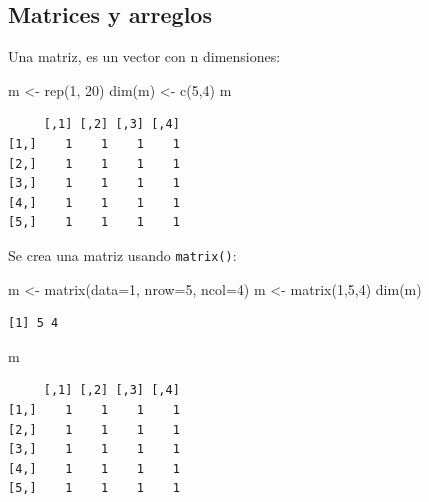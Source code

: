 \documentclass[
  letterpaper,
  DIV=11,
  numbers=noendperiod]{scrartcl}
\newenvironment{Shaded}{\begin{snugshade}}{\end{snugshade}}
\newcommand{\AttributeTok}[1]{\textcolor[rgb]{0.40,0.45,0.13}{#1}}
\newcommand{\DecValTok}[1]{\textcolor[rgb]{0.68,0.00,0.00}{#1}}
\newcommand{\FunctionTok}[1]{\textcolor[rgb]{0.28,0.35,0.67}{#1}}
\newcommand{\NormalTok}[1]{\textcolor[rgb]{0.00,0.23,0.31}{#1}}
\newcommand{\OtherTok}[1]{\textcolor[rgb]{0.00,0.23,0.31}{#1}}
\begin{document}
\subsection{Matrices y arreglos}\label{matrices-y-arreglos}

Una matriz, es un vector con n dimensiones:

\begin{Shaded}
\begin{Highlighting}[]
\NormalTok{m }\OtherTok{\textless{}{-}} \FunctionTok{rep}\NormalTok{(}\DecValTok{1}\NormalTok{, }\DecValTok{20}\NormalTok{)   }
\FunctionTok{dim}\NormalTok{(m) }\OtherTok{\textless{}{-}} \FunctionTok{c}\NormalTok{(}\DecValTok{5}\NormalTok{,}\DecValTok{4}\NormalTok{)  }
\NormalTok{m}
\end{Highlighting}
\end{Shaded}

\begin{verbatim}
     [,1] [,2] [,3] [,4]
[1,]    1    1    1    1
[2,]    1    1    1    1
[3,]    1    1    1    1
[4,]    1    1    1    1
[5,]    1    1    1    1
\end{verbatim}

Se crea una matriz usando \texttt{matrix()}:

\begin{Shaded}
\begin{Highlighting}[]
\NormalTok{m }\OtherTok{\textless{}{-}} \FunctionTok{matrix}\NormalTok{(}\AttributeTok{data=}\DecValTok{1}\NormalTok{, }\AttributeTok{nrow=}\DecValTok{5}\NormalTok{, }\AttributeTok{ncol=}\DecValTok{4}\NormalTok{)  }
\NormalTok{m }\OtherTok{\textless{}{-}} \FunctionTok{matrix}\NormalTok{(}\DecValTok{1}\NormalTok{,}\DecValTok{5}\NormalTok{,}\DecValTok{4}\NormalTok{)                      }
\FunctionTok{dim}\NormalTok{(m)                                }
\end{Highlighting}
\end{Shaded}

\begin{verbatim}
[1] 5 4
\end{verbatim}

\begin{Shaded}
\begin{Highlighting}[]
\NormalTok{m}
\end{Highlighting}
\end{Shaded}

\begin{verbatim}
     [,1] [,2] [,3] [,4]
[1,]    1    1    1    1
[2,]    1    1    1    1
[3,]    1    1    1    1
[4,]    1    1    1    1
[5,]    1    1    1    1
\end{verbatim}
\end{document}
